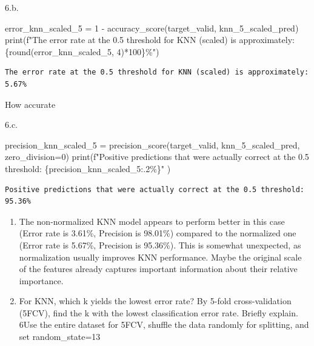 \documentclass[
  11pt,
  letterpaper,
  DIV=11,
  numbers=noendperiod]{scrartcl}
\newenvironment{Shaded}{\begin{snugshade}}{\end{snugshade}}
\newcommand{\BuiltInTok}[1]{\textcolor[rgb]{0.00,0.23,0.31}{#1}}
\newcommand{\DecValTok}[1]{\textcolor[rgb]{0.68,0.00,0.00}{#1}}
\newcommand{\NormalTok}[1]{\textcolor[rgb]{0.00,0.23,0.31}{#1}}
\newcommand{\OperatorTok}[1]{\textcolor[rgb]{0.37,0.37,0.37}{#1}}
\newcommand{\SpecialCharTok}[1]{\textcolor[rgb]{0.37,0.37,0.37}{#1}}
\newcommand{\SpecialStringTok}[1]{\textcolor[rgb]{0.13,0.47,0.30}{#1}}
\begin{document}
6.b.

\begin{Shaded}
\begin{Highlighting}[]
\NormalTok{error\_knn\_scaled\_5 }\OperatorTok{=} \DecValTok{1} \OperatorTok{{-}}\NormalTok{ accuracy\_score(target\_valid, knn\_5\_scaled\_pred)}
\BuiltInTok{print}\NormalTok{(}\SpecialStringTok{f"The error rate at the 0.5 threshold for KNN (scaled) is approximately: }\SpecialCharTok{\{}\BuiltInTok{round}\NormalTok{(error\_knn\_scaled\_5, }\DecValTok{4}\NormalTok{)}\OperatorTok{*}\DecValTok{100}\SpecialCharTok{\}}\SpecialStringTok{\%"}\NormalTok{)}
\end{Highlighting}
\end{Shaded}

\begin{verbatim}
The error rate at the 0.5 threshold for KNN (scaled) is approximately: 5.67%
\end{verbatim}

How accurate

6.c.

\begin{Shaded}
\begin{Highlighting}[]
\NormalTok{precision\_knn\_scaled\_5 }\OperatorTok{=}\NormalTok{ precision\_score(target\_valid, knn\_5\_scaled\_pred, zero\_division}\OperatorTok{=}\DecValTok{0}\NormalTok{)}
\BuiltInTok{print}\NormalTok{(}\SpecialStringTok{f"Positive predictions that were actually correct at the 0.5 threshold: }\SpecialCharTok{\{}\NormalTok{precision\_knn\_scaled\_5}\SpecialCharTok{:.2\%\}}\SpecialStringTok{"}
\NormalTok{)}
\end{Highlighting}
\end{Shaded}

\begin{verbatim}
Positive predictions that were actually correct at the 0.5 threshold: 95.36%
\end{verbatim}

\begin{enumerate}
\def\labelenumi{\arabic{enumi}.}
\setcounter{enumi}{6}
\item
  The non-normalized KNN model appears to perform better in this case
  (Error rate is 3.61\%, Precision is 98.01\%) compared to the
  normalized one (Error rate is 5.67\%, Precision is 95.36\%). This is
  somewhat unexpected, as normalization usually improves KNN
  performance. Maybe the original scale of the features already captures
  important information about their relative importance.
\item
  For KNN, which k yields the lowest error rate? By 5-fold
  cross-validation (5FCV), find the k with the lowest classification
  error rate. Briefly explain. 6Use the entire dataset for 5FCV, shuffle
  the data randomly for splitting, and set random\_state=13
\end{enumerate}
\end{document}

